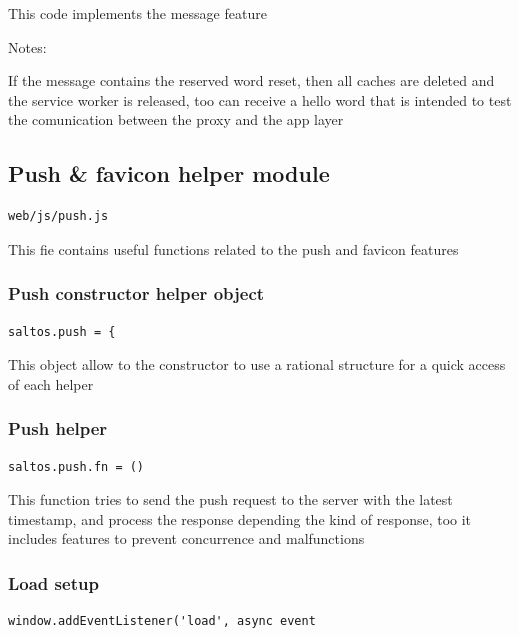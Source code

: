\documentclass[a4paper]{article}
\begin{document}
This code implements the message feature

Notes:

If the message contains the reserved word reset, then all caches are deleted
and the service worker is released, too can receive a hello word that is intended
to test the comunication between the proxy and the app layer

\hypertarget{toc279}{}
\subsection{Push \& favicon helper module}

\begin{lstlisting}
web/js/push.js
\end{lstlisting}

This fie contains useful functions related to the push and favicon features

\hypertarget{toc280}{}
\subsubsection{Push constructor helper object}

\begin{lstlisting}
saltos.push = {
\end{lstlisting}

This object allow to the constructor to use a rational structure for a quick access of each
helper

\hypertarget{toc281}{}
\subsubsection{Push helper}

\begin{lstlisting}
saltos.push.fn = ()
\end{lstlisting}

This function tries to send the push request to the server with the latest
timestamp, and process the response depending the kind of response, too it
includes features to prevent concurrence and malfunctions

\hypertarget{toc282}{}
\subsubsection{Load setup}

\begin{lstlisting}
window.addEventListener('load', async event
\end{lstlisting}
\end{document}
